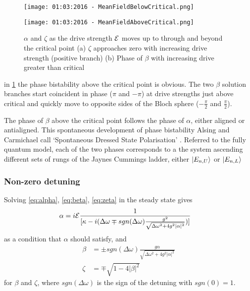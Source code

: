 \begin{figure}[ht]
  \begin{minipage}{.5\linewidth}
    \centering
    \texttt{[image: 01:03:2016 - MeanFieldBelowCritical.png]}
  \end{minipage}%
  \begin{minipage}{.5\linewidth}
    \centering
    \texttt{[image: 01:03:2016 - MeanFieldAboveCritical.png]}
  \end{minipage}
  \caption{$\alpha$ and $\zeta$ as the drive strength $\mathcal{E}$ moves up to through and beyond the critical point (a) $\zeta$ approaches zero with increasing drive strength (positive branch)\label{fig:zeta} (b) Phase of $\beta$ with increasing drive greater than critical}\label{fig:alpha}
\end{figure}

in \cref{fig:alpha} the phase bistability above the critical point is obvious. The two $\beta$ solution branches start coincident in phase ($\pi$ and $-\pi$) at drive strengths just above critical and quickly move to opposite sides of the Bloch sphere ($-\frac{\pi}{2}$ and $\frac{\pi}{2}$).

The phase of $\beta$ above the critical point follows the phase of $\alpha$, either aligned or antialigned. This spontaneous development of phase bistability Alsing and Carmichael call `Spontaneous Dressed State Polarisation' \cite{Alsing1990}. Referred to the fully quantum model, each of the two phases corresponds to a the system ascending different sets of rungs of the Jaynes Cummings ladder, either $| E_{n, U} \rangle$ or $| E_{n, L} \rangle$
\subsubsection{Non-zero detuning}
Solving \cref{eq:alpha}, \cref{eq:beta}, \cref{eq:zeta} in the steady state gives
\begin{align}
  \alpha& = i \mathcal{E}\frac{1}{[\kappa-i(\Delta \omega \mp sgn(\Delta \omega) \frac{g^2}{\sqrt{\Delta \omega^2 +4g^2 |\alpha|^2}})]}
\end{align}
as a condition that $\alpha$ should satisfy, and
\begin{align}
  \beta& = \pm sgn(\Delta \omega) \frac{g \alpha}{\sqrt{\Delta \omega^2 + 4 g^2 |\alpha|^2}}\\
  \zeta& = \mp \sqrt{1-4|\beta|^2}
\end{align}
for $\beta$ and $\zeta$, where $sgn(\Delta \omega)$ is the sign of the detuning with $sgn(0) = 1$.

